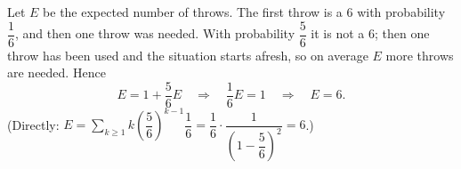 Let $E$ be the expected number of throws. The first throw is a $6$ with probability $\dfrac{1}{6}$, and then one throw was needed. With probability $\dfrac{5}{6}$ it is not a $6$; then one throw has been used and the situation starts afresh, so on average $E$ more throws are needed. Hence
\[
E=1+\dfrac{5}{6}E\quad\Longrightarrow\quad\dfrac{1}{6}E=1\quad\Longrightarrow\quad E=\boxed{6}.
\]
(Directly: $E=\sum_{k\ge1}k\left(\dfrac{5}{6}\right)^{k-1}\dfrac{1}{6}=\dfrac{1}{6}\cdot\dfrac{1}{\left(1-\dfrac{5}{6}\right)^2}=6$.)
